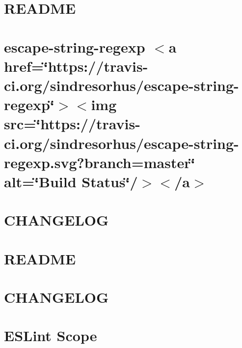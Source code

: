 \let\mypdfximage\pdfximage\def\pdfximage{\immediate\mypdfximage}\documentclass[twoside]{book}
\newcommand{\+}{\discretionary{\mbox{\scriptsize$\hookleftarrow$}}{}{}}
\begin{document}
\chapter{R\+E\+A\+D\+ME}
\label{md_heap-visualizer_node_modules_es6-promisify__r_e_a_d_m_e}

\chapter{escape-\/string-\/regexp $<$a href=\char`\"{}https\+://travis-\/ci.\+org/sindresorhus/escape-\/string-\/regexp\char`\"{}$>$$<$img src=\char`\"{}https\+://travis-\/ci.\+org/sindresorhus/escape-\/string-\/regexp.\+svg?branch=master\char`\"{} alt=\char`\"{}\+Build Status\char`\"{}/$>$$<$/a$>$}
\label{md_heap-visualizer_node_modules_escape-string-regexp_readme}

\chapter{C\+H\+A\+N\+G\+E\+L\+OG}
\label{md_heap-visualizer_node_modules_eslint__c_h_a_n_g_e_l_o_g}

\chapter{R\+E\+A\+D\+ME}
\label{md_heap-visualizer_node_modules_eslint__r_e_a_d_m_e}

\chapter{C\+H\+A\+N\+G\+E\+L\+OG}
\label{md_heap-visualizer_node_modules_eslint-scope__c_h_a_n_g_e_l_o_g}

\chapter{E\+S\+Lint Scope}
\label{md_heap-visualizer_node_modules_eslint-scope__r_e_a_d_m_e}

\end{document}
